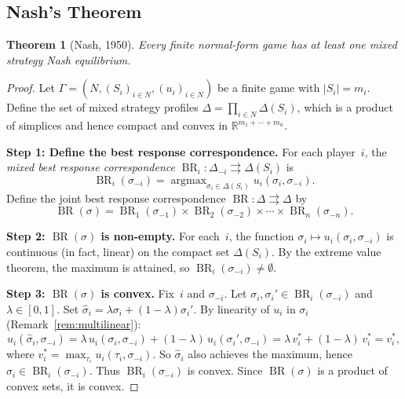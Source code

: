 \documentclass[11pt,a4paper]{article}
\theoremstyle{definition}
\theoremstyle{plain}
\newtheorem{theorem}{Theorem}[section]
\theoremstyle{remark}
\newcommand{\R}{\mathbb{R}}
\DeclareMathOperator{\argmax}{argmax}
\DeclareMathOperator{\BR}{BR}
\begin{document}
\subsection{Nash's Theorem}
\label{subsec:nash_theorem}

\begin{keyresult}
\begin{theorem}[Nash, 1950]
\label{thm:nash_existence}
Every finite normal-form game has at least one mixed strategy Nash equilibrium.
\end{theorem}
\end{keyresult}

\begin{proof}
Let $\Gamma = (N, (S_i)_{i \in N}, (u_i)_{i \in N})$ be a finite game with
$|S_i| = m_i$. Define the set of mixed strategy profiles
$\Delta = \prod_{i \in N} \Delta(S_i)$, which is a product of simplices and hence
compact and convex in $\R^{m_1 + \cdots + m_n}$.

\textbf{Step 1: Define the best response correspondence.}
For each player~$i$, the \emph{mixed best response correspondence}
$\BR_i : \Delta_{-i} \rightrightarrows \Delta(S_i)$ is
\[
    \BR_i(\sigma_{-i}) = \argmax_{\sigma_i \in \Delta(S_i)} u_i(\sigma_i, \sigma_{-i}).
\]
Define the joint best response correspondence $\BR : \Delta \rightrightarrows \Delta$ by
\[
    \BR(\sigma) = \BR_1(\sigma_{-1}) \times \BR_2(\sigma_{-2}) \times \cdots
    \times \BR_n(\sigma_{-n}).
\]

\textbf{Step 2: $\BR(\sigma)$ is non-empty.}
For each~$i$, the function $\sigma_i \mapsto u_i(\sigma_i, \sigma_{-i})$ is
continuous (in fact, linear) on the compact set $\Delta(S_i)$. By the extreme value
theorem, the maximum is attained, so $\BR_i(\sigma_{-i}) \neq \emptyset$.

\textbf{Step 3: $\BR(\sigma)$ is convex.}
Fix~$i$ and $\sigma_{-i}$. Let $\sigma_i, \sigma_i' \in \BR_i(\sigma_{-i})$ and
$\lambda \in [0,1]$. Set $\hat{\sigma}_i = \lambda \sigma_i + (1-\lambda)\sigma_i'$.
By linearity of $u_i$ in $\sigma_i$ (Remark~\ref{rem:multilinear}):
\[
    u_i(\hat{\sigma}_i, \sigma_{-i})
    = \lambda\, u_i(\sigma_i, \sigma_{-i}) + (1-\lambda)\, u_i(\sigma_i', \sigma_{-i})
    = \lambda\, v_i^* + (1-\lambda)\, v_i^* = v_i^*,
\]
where $v_i^* = \max_{\tau_i} u_i(\tau_i, \sigma_{-i})$. So $\hat{\sigma}_i$ also
achieves the maximum, hence $\hat{\sigma}_i \in \BR_i(\sigma_{-i})$. Thus
$\BR_i(\sigma_{-i})$ is convex. Since $\BR(\sigma)$ is a product of convex sets,
it is convex.


\end{proof}
\end{document}
